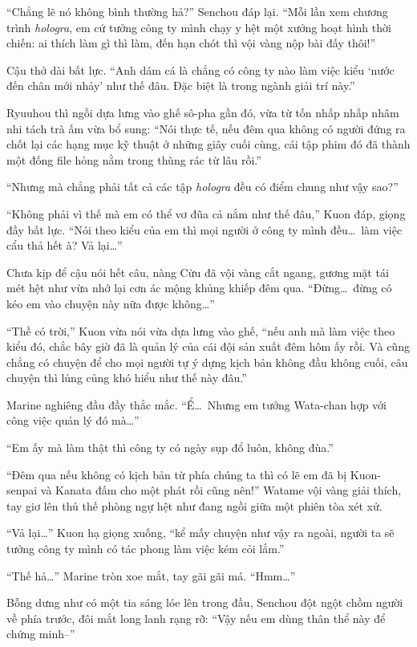 \documentclass[../main.tex]{subfiles}
\begin{document}
``Chẳng lẽ nó không bình thường hả?'' Senchou đáp lại. ``Mỗi lần xem chương trình \textit{hologra}, em cứ tưởng công ty mình chạy y hệt một xưởng hoạt hình thời chiến: ai thích làm gì thì làm, đến hạn chót thì vội vàng nộp bài đấy thôi!''

Cậu thở dài bất lực. ``Anh dám cá là chẳng có công ty nào làm việc kiểu `nước đến chân mới nhảy' như thế đâu. Đặc biệt là trong ngành giải trí này.''

Ryuuhou thì ngồi dựa lưng vào ghế sô-pha gần đó, vừa từ tốn nhấp nhấp nhâm nhi tách trà ấm vừa bổ sung: ``Nói thực tế, nếu đêm qua không có người đứng ra chốt lại các hạng mục kỹ thuật ở những giây cuối cùng, cái tập phim đó đã thành một đống file hỏng nằm trong thùng rác từ lâu rồi.''

``Nhưng mà chẳng phải tất cả các tập \textit{hologra} đều có điểm chung như vậy sao?''

``Không phải vì thế mà em có thể vơ đũa cả nắm như thế đâu,'' Kuon đáp, giọng đầy bất lực. ``Nói theo kiểu của em thì mọi người ở công ty mình đều\dots\ làm việc cẩu thả hết à? Vả lại\dots''

Chưa kịp để cậu nói hết câu, nàng Cừu đã vội vàng cắt ngang, gương mặt tái mét hệt như vừa nhớ lại cơn ác mộng khủng khiếp đêm qua. ``Đừng\dots\ đừng có kéo em vào chuyện này nữa được không\dots''

``Thề có trời,'' Kuon vừa nói vừa dựa lưng vào ghế, ``nếu anh mà làm việc theo kiểu đó, chắc bây giờ đã là quản lý của cái đội sản xuất đêm hôm ấy rồi. Và cũng chẳng có chuyện để cho mọi người tự ý dựng kịch bản không đầu không cuối, câu chuyện thì lủng củng khó hiểu như thế này đâu.''

Marine nghiêng đầu đầy thắc mắc. ``Ể\dots\ Nhưng em tưởng Wata-chan hợp với công việc quản lý đó mà\dots''

``Em ấy mà làm thật thì công ty có ngày sụp đổ luôn, không đùa.''

``Đêm qua nếu không có kịch bản từ phía chúng ta thì có lẽ em đã bị Kuon-senpai và Kanata đấm cho một phát rồi cũng nên!'' Watame vội vàng giải thích, tay giơ lên thủ thế phòng ngự hệt như đang ngồi giữa một phiên tòa xét xử.

``Vả lại\dots'' Kuon hạ giọng xuống, ``kể mấy chuyện như vậy ra ngoài, người ta sẽ tưởng công ty mình có tác phong làm việc kém cỏi lắm.''

``Thế hả\dots'' Marine tròn xoe mắt, tay gãi gãi má. ``Hmm\dots''


Bỗng dưng như có một tia sáng lóe lên trong đầu, Senchou đột ngột chồm người về phía trước, đôi mắt long lanh rạng rỡ: ``Vậy nếu em dùng thân thể này để chứng minh--''
\end{document}
